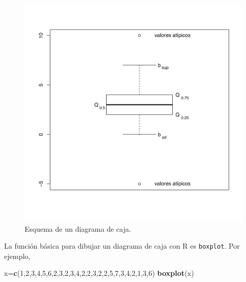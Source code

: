 \documentclass[
]{book}
\newenvironment{Shaded}{\begin{snugshade}}{\end{snugshade}}
\newcommand{\DecValTok}[1]{\textcolor[rgb]{0.00,0.00,0.81}{#1}}
\newcommand{\KeywordTok}[1]{\textcolor[rgb]{0.13,0.29,0.53}{\textbf{#1}}}
\newcommand{\NormalTok}[1]{#1}
\theoremstyle{definition}
\theoremstyle{definition}
\theoremstyle{definition}
\theoremstyle{remark}
\begin{document}
\begin{figure}

{\centering \includegraphics[width=0.9\linewidth]{AprendeR-Parte-I_files/figure-html/boxplotgen} 

}

\caption{Esquema de un diagrama de caja.}\label{fig:boxplot}
\end{figure}

La función básica para dibujar un diagrama de caja con R es \texttt{boxplot}. Por ejemplo,

\begin{Shaded}
\begin{Highlighting}[]
\NormalTok{x=}\KeywordTok{c}\NormalTok{(}\DecValTok{1}\NormalTok{,}\DecValTok{2}\NormalTok{,}\DecValTok{3}\NormalTok{,}\DecValTok{4}\NormalTok{,}\DecValTok{5}\NormalTok{,}\DecValTok{6}\NormalTok{,}\DecValTok{2}\NormalTok{,}\DecValTok{3}\NormalTok{,}\DecValTok{2}\NormalTok{,}\DecValTok{3}\NormalTok{,}\DecValTok{4}\NormalTok{,}\DecValTok{2}\NormalTok{,}\DecValTok{2}\NormalTok{,}\DecValTok{3}\NormalTok{,}\DecValTok{2}\NormalTok{,}\DecValTok{2}\NormalTok{,}\DecValTok{5}\NormalTok{,}\DecValTok{7}\NormalTok{,}\DecValTok{3}\NormalTok{,}\DecValTok{4}\NormalTok{,}\DecValTok{2}\NormalTok{,}\DecValTok{1}\NormalTok{,}\DecValTok{3}\NormalTok{,}\DecValTok{6}\NormalTok{)}
\KeywordTok{boxplot}\NormalTok{(x)}
\end{Highlighting}
\end{Shaded}
\end{document}
